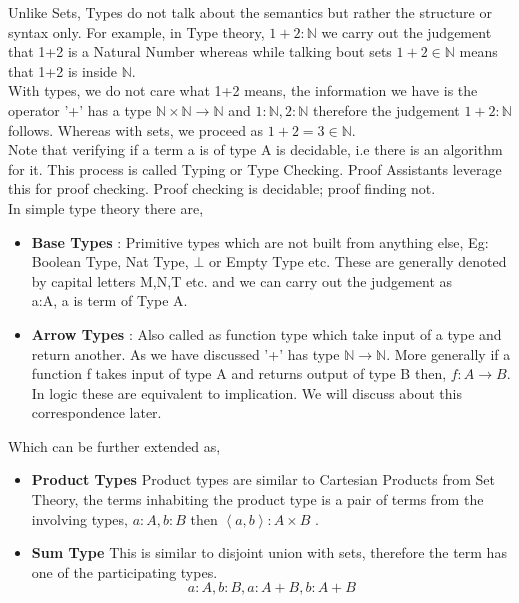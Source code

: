 \documentclass[12pt]{article}
\begin{document}
Unlike Sets, Types do not talk about the semantics but rather the structure or syntax only. For example, in Type theory, $1+2:\mathbb{N}$ we carry out the judgement that 1+2 is a Natural Number whereas while talking bout sets $1+2 \in \mathbb{N}$  means that 1+2 is inside $\mathbb{N}$. \\With types, we do not care what 1+2 means, the information we have is the operator '+' has a type $\mathbb{N} \times \mathbb{N}  \to \mathbb{N}$ and  $1:\mathbb{N}, 2:\mathbb{N}$ therefore the judgement  $1+2:\mathbb{N}$ follows. Whereas with sets, we proceed as $1+2=3\in \mathbb{N}$.\\

Note that verifying if a term a is of type A is decidable, i.e there is an algorithm for it. This process is called Typing or Type Checking. Proof Assistants leverage this for proof checking. Proof checking is decidable; proof finding not. \cite{Geuvers2009}\\


In simple type theory there are, 
\begin{itemize}
    \item \textbf{Base Types} : Primitive types which are not built from anything else, Eg: Boolean Type, Nat Type, $\bot$ or Empty Type etc. These are generally denoted by capital letters M,N,T etc. and we can carry out the judgement as\\
        a:A, a is term of Type A.\\ 
        
    \item \textbf{Arrow Types} : Also called as function type which take input of a type and return another. As we have discussed '+' has type $\mathbb{N} \to \mathbb{N}$. More generally if a function f takes input of type A and returns output of type B then, $f:A \to B$. In logic these are equivalent to implication. We will discuss about this correspondence later.
    
\end{itemize}

Which can be further extended as,
\begin{itemize}
    \item \textbf{Product Types} Product types are similar to Cartesian Products from Set Theory, the terms inhabiting the product type is a pair of terms from the involving types, $a:A, b:B $ then $ \left\langle a,b \right\rangle : A \times B$ .
    \item \textbf{Sum Type} This is similar to disjoint union with sets, therefore the term has one of the participating types. 
     $$a:A, b:B, a:A+B, b:A+B$$

    
\end{itemize}
\end{document}
